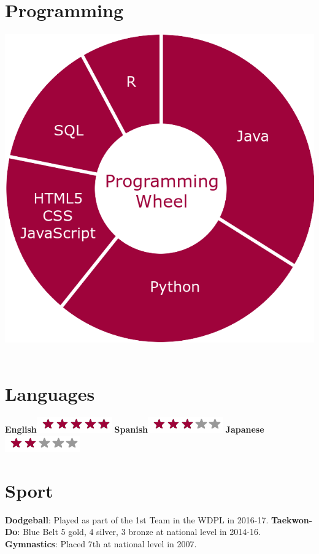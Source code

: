 \documentclass[]{friggeri-cv}
\begin{document}
\begin{aside}
  \section{Programming}
    \includegraphics[scale=0.15]{img/programmingwheel.png}
    ~
  \section{Languages}
    \textbf{English}\includegraphics[scale=0.40]{img/5stars.png}
    \textbf{Spanish}\includegraphics[scale=0.40]{img/3stars.png}
    \textbf{Japanese}\includegraphics[scale=0.40]{img/2stars.png}
    ~
    \section{Sport}
        \textbf{Dodgeball}:
        Played as part of the 1st Team in the WDPL in 2016-17.
        \textbf{Taekwon-Do}:
        Blue Belt
        5 gold, 4 silver, 3 bronze at national level in 2014-16.
        \textbf{Gymnastics}:
        Placed 7th at national level in 2007.
    ~
\end{aside}
\end{document}
